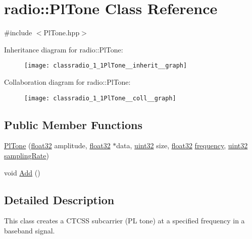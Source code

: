 \hypertarget{classradio_1_1PlTone}{\section{radio\+:\+:Pl\+Tone Class Reference}
\label{classradio_1_1PlTone}
}


{\ttfamily \#include $<$Pl\+Tone.\+hpp$>$}



Inheritance diagram for radio\+:\+:Pl\+Tone\+:
\nopagebreak
\begin{figure}[H]
\begin{center}
\leavevmode
\texttt{[image: classradio\_1\_1PlTone\_\_inherit\_\_graph]}
\end{center}
\end{figure}


Collaboration diagram for radio\+:\+:Pl\+Tone\+:
\nopagebreak
\begin{figure}[H]
\begin{center}
\leavevmode
\texttt{[image: classradio\_1\_1PlTone\_\_coll\_\_graph]}
\end{center}
\end{figure}
\subsection*{Public Member Functions}
\begin{DoxyCompactItemize}
\item 
\hyperlink{classradio_1_1PlTone_aaf1bc146478693f3e921bdc6f8ea2379}{Pl\+Tone} (\hyperlink{definitions_8hpp_aacdc525d6f7bddb3ae95d5c311bd06a1}{float32} amplitude, \hyperlink{definitions_8hpp_aacdc525d6f7bddb3ae95d5c311bd06a1}{float32} $\ast$data, \hyperlink{definitions_8hpp_a1134b580f8da4de94ca6b1de4d37975e}{uint32} size, \hyperlink{definitions_8hpp_aacdc525d6f7bddb3ae95d5c311bd06a1}{float32} \hyperlink{classradio_1_1Sinusoid_ad429b5dd330e96aaf89a0d48ef59d3f2}{frequency}, \hyperlink{definitions_8hpp_a1134b580f8da4de94ca6b1de4d37975e}{uint32} \hyperlink{classradio_1_1Sinusoid_a964d64aae9acc4ea5d752534a33d76b8}{sampling\+Rate})
\item 
void \hyperlink{classradio_1_1PlTone_a9e19b2d5106b35626d4839f04f9b9f95}{Add} ()
\end{DoxyCompactItemize}


\subsection{Detailed Description}
This class creates a C\+T\+C\+S\+S subcarrier (P\+L tone) at a specified frequency in a baseband signal. 


